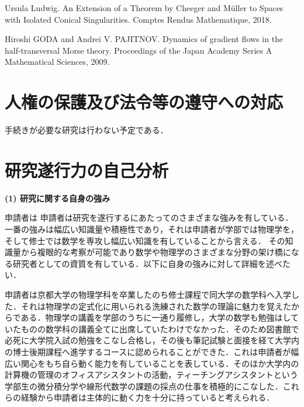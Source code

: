 \documentclass[11pt,a4j,dvipdfmx]{jarticle} 					%
\newcommand{\研究課題名}{象の卵}
\newcommand{\研究機関名}{京都大学}
\newcommand{\研究代表者氏名}{福士謙二}
\begin{document}
\noindent
[4] Ursula Ludwig. An Extension of a Theorem by Cheeger and M\"{u}ller to Spaces with Isolated Conical Singularities. Comptes Rendus Mathematique, 2018.

\noindent
[5] Hiroshi GODA and Andrei V. PAJITNOV. Dynamics of gradient flows in the half-transversal Morse theory. Proceedings of the Japan Academy Series A Mathematical Sciences, 2009.





\section{人権の保護及び法令等の遵守への対応}

手続きが必要な研究は行わない予定である．





\section{研究遂行力の自己分析}


\noindent
\textbf{(1) 研究に関する自身の強み}

申請者は
申請者は研究を遂行するにあたってのさまざまな強みを有している．一番の強みは幅広い知識量や積極性であり，それは申請者が学部では物理学を，そして修士では数学を専攻し幅広い知識を有していることから言える．
その知識量から複眼的な考察が可能であり数学や物理学のさまざまな分野の架け橋になる研究者としての資質を有している．以下に自身の強みに対して詳細を述べたい．



\noindent
{}

申請者は京都大学の物理学科を卒業したのち修士課程で同大学の数学科へ入学した．それは物理学の定式化に用いられる洗練された数学の理論に魅力を覚えたからである．物理学の講義を学部のうちに一通り履修し，大学の数学も勉強はしていたものの数学科の講義全てに出席していたわけでなかった．そのため図書館で必死に大学院入試の勉強をこなし合格し，その後も筆記試験と面接を経て大学内の博士後期課程へ進学するコースに認められることができた．これは申請者が幅広い関心をもち自ら動く能力を有していることを表している．そのほか大学内の計算機の管理のオフィスアシスタントの活動，ティーチングアシスタントという学部生の微分積分学や線形代数学の課題の採点の仕事を積極的にこなした．これらの経験から申請者は主体的に動く力を十分に持っていると考えられる．
\end{document}
